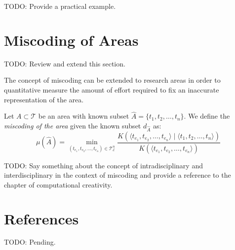 {\color{red} TODO: Provide a practical example.}

%
%
\section{Miscoding of Areas}

{\color{red} TODO: Review and extend this section.}

The concept of miscoding can be extended to research areas in order to quantitative measure the amount of effort required to fix an inaccurate representation of the area.

\begin{definition}
Let $A \subset \mathcal{T}$ be an area with known subset $\hat{A} = \{t_1, t_2, \ldots, t_n\}$. We define the \emph{miscoding of the area} given the known subset $d_{\hat{A}}$ as:
\[
\mu(\hat{A}) = \min_{(t_{e_1}, t_{e_2}, \ldots, t_{e_n}) \in \mathcal{T}_\mathcal{E}^n}  \frac{K \left( \langle t_{e_1}, t_{e_2}, \ldots, t_{e_n} \rangle \mid \langle t_1, t_2, \ldots, t_n \rangle \right) }{K \left( \langle t_{e_1}, t_{e_2}, \ldots, t_{e_n} \rangle \right)}
\]
\end{definition}

{\color{red} TODO: Say something about the concept of intradisciplinary and interdisciplinary in the context of miscoding and provide a reference to the chapter of computational creativity.}

%
%

\section*{References}

{\color{red} TODO: Pending.}
